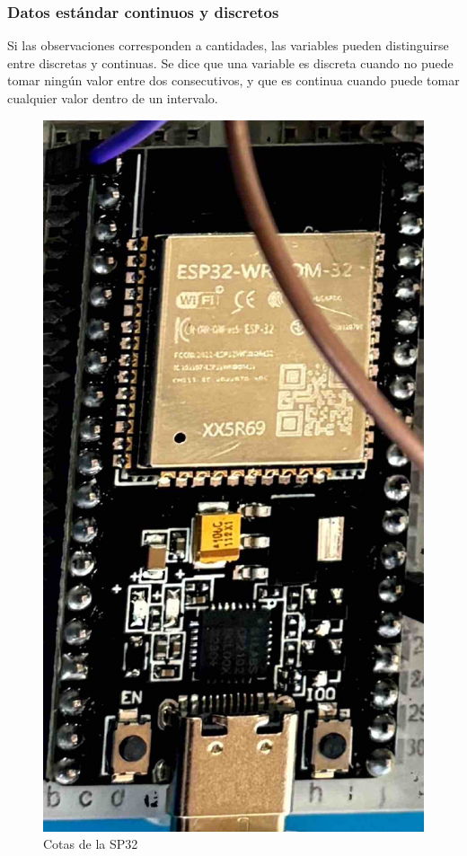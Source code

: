     \subsubsection{Datos estándar continuos y discretos}
    Si las observaciones corresponden a cantidades, las variables pueden distinguirse entre discretas y continuas. Se dice que una variable es discreta cuando no puede tomar ningún valor entre dos consecutivos, y que es continua cuando puede tomar cualquier valor dentro de un intervalo.
    \cite{Datoscontinuosydiscretos}
    \begin{figure}[H]
        \centering
        \includegraphics[trim = {1mm 1mm 1mm 1mm},clip,scale=0.3]{8/Img/SP32.pdf}
        \caption{Cotas de la SP32}
        \label{Cotas SP32}
    \end{figure}
    
